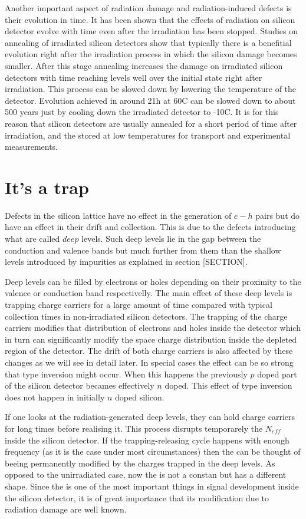 Another important aspect of radiation damage and radiation-induced defects is their evolution in time. It has been shown that the effects of radiation on silicon detector evolve with time even after the irradiation has been stopped. Studies on annealing of irradiated silicon detectors show that typically there is a benefitial evolution right after the irradiation process in which the silicon damage becomes smaller. After this stage annealing increases the damage on irradiated silicon detectors with time reaching levels well over the initial state right after irradiation. This process can be slowed down by lowering the temperature of the detector. Evolution achieved in around 21h at 60C can be slowed down to about 500 years just by cooling down the irradiated detector to -10C. It is for this reason that silicon detectors are usually annealed for a short period of time after irradiation, and the stored at low temperatures for transport and experimental measurements.

\section{It's a trap}

Defects in the silicon lattice have no effect in the generation of $e-h$ pairs but do have an effect in their drift and collection. This is due to the defects introducing what are called $deep$ levels. Such deep levels lie in the gap between the conduction and valence bands but much further from them than the shallow levels introduced by impurities as explained in section [SECTION].

Deep levels can be filled by electrons or holes depending on their proximity to the valence or conduction band respectivelly. The main effect of these deep levels is trapping charge carriers for a large amount of time compared with typical collection times in non-irradiated silicon detectors. The trapping of the charge carriers modifies that distribution of electrons and holes inside the detector which in turn can significantly modify the space charge distribution inside the depleted region of the detector. The drift of both charge carriers is also affected by these changes as we will see in detail later. In special cases the effect can be so strong that type inversion might occur. When this happens the previously $p$ doped part of the silicon detector becames effectively $n$ doped. This effect of type inversion does not happen in initially $n$ doped silicon.

If one looks at the radiation-generated deep levels, they can hold charge carriers for long times before realising it. This process disrupts temporarely the $N_{eff}$ inside the silicon detector. If the trapping-releasing cycle happens with enough frequency (as it is the case under most circumstances) then the \neff can be thought of beeing permanently modified by the charges trapped in the deep levels. As opposed to the unirradiated case, now the \neff is not a constan but has a different shape. Since the \neff is one of the most important things in signal development inside the silicon detector, it is of great importance that its modification due to radiation damage are well known.

